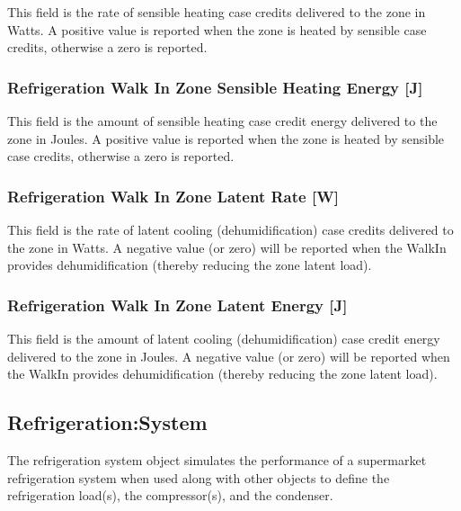 This field is the rate of sensible heating case credits delivered to the zone in Watts. A positive value is reported when the zone is heated by sensible case credits, otherwise a zero is reported.

\subsubsection{Refrigeration Walk In Zone Sensible Heating Energy {[}J{]}}\label{refrigeration-walk-in-zone-sensible-heating-energy-j}

This field is the amount of sensible heating case credit energy delivered to the zone in Joules. A positive value is reported when the zone is heated by sensible case credits, otherwise a zero is reported.

\subsubsection{Refrigeration Walk In Zone Latent Rate {[}W{]}}\label{refrigeration-walk-in-zone-latent-rate-w}

This field is the rate of latent cooling (dehumidification) case credits delivered to the zone in Watts. A negative value (or zero) will be reported when the WalkIn provides dehumidification (thereby reducing the zone latent load).

\subsubsection{Refrigeration Walk In Zone Latent Energy {[}J{]}}\label{refrigeration-walk-in-zone-latent-energy-j}

This field is the amount of latent cooling (dehumidification) case credit energy delivered to the zone in Joules. A negative value (or zero) will be reported when the WalkIn provides dehumidification (thereby reducing the zone latent load).

\subsection{Refrigeration:System}\label{refrigerationsystem}

The refrigeration system object simulates the performance of a supermarket refrigeration system when used along with other objects to define the refrigeration load(s), the compressor(s), and the condenser.

